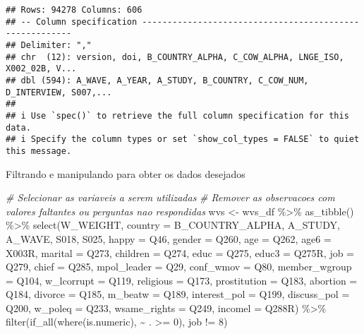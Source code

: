 \documentclass[
]{article}
\newenvironment{Shaded}{\begin{snugshade}}{\end{snugshade}}
\newcommand{\AttributeTok}[1]{\textcolor[rgb]{0.77,0.63,0.00}{#1}}
\newcommand{\CommentTok}[1]{\textcolor[rgb]{0.56,0.35,0.01}{\textit{#1}}}
\newcommand{\DecValTok}[1]{\textcolor[rgb]{0.00,0.00,0.81}{#1}}
\newcommand{\FunctionTok}[1]{\textcolor[rgb]{0.00,0.00,0.00}{#1}}
\newcommand{\NormalTok}[1]{#1}
\newcommand{\OtherTok}[1]{\textcolor[rgb]{0.56,0.35,0.01}{#1}}
\newcommand{\SpecialCharTok}[1]{\textcolor[rgb]{0.00,0.00,0.00}{#1}}
\begin{document}
\begin{verbatim}
## Rows: 94278 Columns: 606
## -- Column specification --------------------------------------------------------
## Delimiter: ","
## chr  (12): version, doi, B_COUNTRY_ALPHA, C_COW_ALPHA, LNGE_ISO, X002_02B, V...
## dbl (594): A_WAVE, A_YEAR, A_STUDY, B_COUNTRY, C_COW_NUM, D_INTERVIEW, S007,...
## 
## i Use `spec()` to retrieve the full column specification for this data.
## i Specify the column types or set `show_col_types = FALSE` to quiet this message.
\end{verbatim}

Filtrando e manipulando para obter os dados desejados

\begin{Shaded}
\begin{Highlighting}[]
\CommentTok{\# Selecionar as variaveis a serem utilizadas}
\CommentTok{\# Remover as observacoes com valores faltantes ou perguntas nao respondidas}
\NormalTok{wvs }\OtherTok{\textless{}{-}}\NormalTok{ wvs\_df }\SpecialCharTok{\%\textgreater{}\%} 
  \FunctionTok{as\_tibble}\NormalTok{() }\SpecialCharTok{\%\textgreater{}\%} 
  \FunctionTok{select}\NormalTok{(W\_WEIGHT, }\AttributeTok{country =}\NormalTok{ B\_COUNTRY\_ALPHA, A\_STUDY, A\_WAVE, S018, S025,}
         \AttributeTok{happy =}\NormalTok{ Q46, }\AttributeTok{gender =}\NormalTok{ Q260, }\AttributeTok{age =}\NormalTok{ Q262, }\AttributeTok{age6 =}\NormalTok{ X003R, }\AttributeTok{marital =}\NormalTok{ Q273,}
         \AttributeTok{children =}\NormalTok{ Q274, }\AttributeTok{educ =}\NormalTok{ Q275, }\AttributeTok{educ3 =}\NormalTok{ Q275R, }\AttributeTok{job =}\NormalTok{ Q279, }\AttributeTok{chief =}\NormalTok{ Q285,}
         \AttributeTok{mpol\_leader =}\NormalTok{ Q29, }\AttributeTok{conf\_wmov =}\NormalTok{ Q80, }\AttributeTok{member\_wgroup =}\NormalTok{ Q104, }\AttributeTok{w\_lcorrupt =}\NormalTok{ Q119,}
         \AttributeTok{religious =}\NormalTok{ Q173, }\AttributeTok{prostitution =}\NormalTok{ Q183, }\AttributeTok{abortion =}\NormalTok{ Q184, }\AttributeTok{divorce =}\NormalTok{ Q185,}
         \AttributeTok{m\_beatw =}\NormalTok{ Q189, }\AttributeTok{interest\_pol =}\NormalTok{ Q199, }\AttributeTok{discuss\_pol =}\NormalTok{ Q200, }\AttributeTok{w\_poleq =}\NormalTok{ Q233,}
         \AttributeTok{wsame\_rights =}\NormalTok{ Q249, }\AttributeTok{incomel =}\NormalTok{ Q288R) }\SpecialCharTok{\%\textgreater{}\%} 
  \FunctionTok{filter}\NormalTok{(}\FunctionTok{if\_all}\NormalTok{(}\FunctionTok{where}\NormalTok{(is.numeric), }\SpecialCharTok{\textasciitilde{}}\NormalTok{ . }\SpecialCharTok{\textgreater{}=} \DecValTok{0}\NormalTok{),}
\NormalTok{         job }\SpecialCharTok{!=} \DecValTok{8}\NormalTok{)}


\end{Highlighting}
\end{Shaded}
\end{document}
